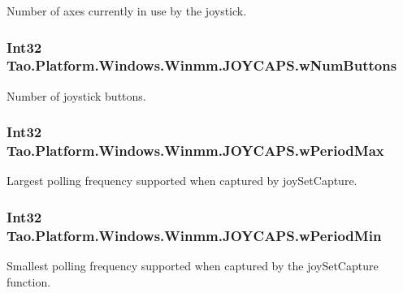 Number of axes currently in use by the joystick. 

\hypertarget{struct_tao_1_1_platform_1_1_windows_1_1_winmm_1_1_j_o_y_c_a_p_s_ae35c0f06295d93b62f9e670380873319}{
\subsubsection[{wNumButtons}]{\setlength{\rightskip}{0pt plus 5cm}Int32 {\bf Tao.Platform.Windows.Winmm.JOYCAPS.wNumButtons}}}
\label{struct_tao_1_1_platform_1_1_windows_1_1_winmm_1_1_j_o_y_c_a_p_s_ae35c0f06295d93b62f9e670380873319}


Number of joystick buttons. 

\hypertarget{struct_tao_1_1_platform_1_1_windows_1_1_winmm_1_1_j_o_y_c_a_p_s_a6337fb9e97e1d1666abdeadb4fdcfb46}{
\subsubsection[{wPeriodMax}]{\setlength{\rightskip}{0pt plus 5cm}Int32 {\bf Tao.Platform.Windows.Winmm.JOYCAPS.wPeriodMax}}}
\label{struct_tao_1_1_platform_1_1_windows_1_1_winmm_1_1_j_o_y_c_a_p_s_a6337fb9e97e1d1666abdeadb4fdcfb46}


Largest polling frequency supported when captured by joySetCapture. 

\hypertarget{struct_tao_1_1_platform_1_1_windows_1_1_winmm_1_1_j_o_y_c_a_p_s_ac54547f60453f0b4452157fa8916498f}{
\subsubsection[{wPeriodMin}]{\setlength{\rightskip}{0pt plus 5cm}Int32 {\bf Tao.Platform.Windows.Winmm.JOYCAPS.wPeriodMin}}}
\label{struct_tao_1_1_platform_1_1_windows_1_1_winmm_1_1_j_o_y_c_a_p_s_ac54547f60453f0b4452157fa8916498f}


Smallest polling frequency supported when captured by the joySetCapture function. 

